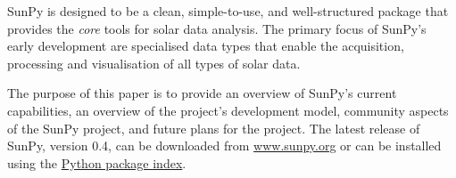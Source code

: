 SunPy is designed to be a clean, simple-to-use, and well-structured 
package that provides the \textit{core} tools for solar data analysis. 
The primary focus of SunPy's early development are 
specialised data types that enable the acquisition, processing and 
visualisation of all types of solar data.

The purpose of this paper is to provide an overview of SunPy's current 
capabilities, an overview of the project's development model, community aspects of the 
SunPy project, and future plans for the project. The latest release of SunPy, version 0.4,
can be downloaded from \href{http://sunpy.org}{www.sunpy.org} or can be
installed using the \href{http://pypi.python.org/pypi}{Python package index}.
